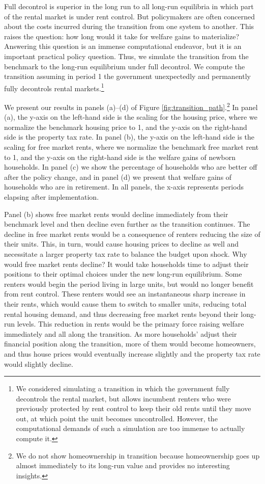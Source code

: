 \documentclass[parskip=full]{article}
\begin{document}
Full decontrol is superior in the long run to all long-run equilibria in which part of the rental market is under rent control. But policymakers are often concerned about the costs incurred during the transition from one system to another. This raises the question: how long would it take for welfare gains to materialize? Answering this question is an immense computational endeavor, but it is an important practical policy question. Thus, we simulate the transition from the benchmark to the long-run equilibrium under full decontrol. We compute the transition assuming in period 1 the government unexpectedly and permanently fully decontrols rental markets.\footnote{We considered simulating a transition in which the government fully decontrols the rental market, but allows incumbent renters who were previously protected by rent control to keep their old rents until they move out, at which point the unit becomes uncontrolled. However, the computational demands of such a simulation are too immense to actually compute it.}

We present our results in panels (a)--(d) of Figure \ref{fig:transition_path}.\footnote{We do not show homeownership in transition because homeownership goes up almost immediately to its long-run value and provides no interesting insights.} In panel (a), the y-axis on the left-hand side is the scaling for the housing price, where we normalize the benchmark housing price to 1, and the y-axis on the right-hand side is the property tax rate. In panel (b), the y-axis on the left-hand side is the scaling for free market rents, where we normalize the benchmark free market rent to 1, and the y-axis on the right-hand side is the welfare gains of newborn households. In panel (c) we show the percentage of households who are better off after the policy change, and in panel (d) we present that welfare gains of households who are in retirement. In all panels, the x-axis represents periods elapsing after implementation.

Panel (b) shows free market rents would decline immediately from their benchmark level and then decline even further as the transition continues. The decline in free market rents would be a consequence of renters reducing the size of their units. This, in turn, would cause housing prices to decline as well and necessitate a larger property tax rate to balance the budget upon shock. Why would free market rents decline? It would take households time to adjust their positions to their optimal choices under the new long-run equilibrium. Some renters would begin the period living in large units, but would no longer benefit from rent control. These renters would see an instantaneous sharp increase in their rents, which would cause them to switch to smaller units, reducing total rental housing demand, and thus decreasing free market rents beyond their long-run levels. This reduction in rents would be the primary force raising welfare immediately and all along the transition. As more households' adjust their financial position along the transition, more of them would become homeowners, and thus house prices would eventually increase slightly and the property tax rate would slightly decline. 
\end{document}
